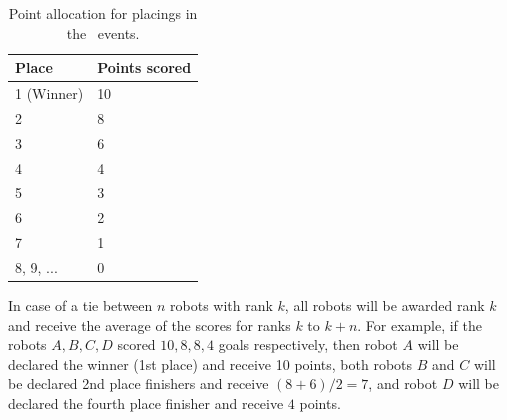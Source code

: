 \documentclass[12pt]{hurocup}
\begin{document}
\begin{lawlist}[OR]
\begin{itemize}
    \begin{table}
      \begin{center}
        \begin{tabular}{l|l}
          \hline
          Place & Points scored \\
          \hline
          1 (Winner) & 10 \\
          2          & 8 \\
          3          & 6 \\
          4          & 4 \\
          5          & 3 \\
          6          & 2 \\
          7          & 1 \\
          8, 9, ...  & 0 \\
          \hline
        \end{tabular}
      \end{center}
      \caption{Point allocation for placings in the \HuroCup\ events.}
      \label{point-allocation}
    \end{table}
  \end{itemize}

\item In case of a tie between $n$ robots with rank $k$, all robots
 will be awarded rank $k$ and receive the average of the scores for
 ranks $k$ to $k+n$.  For example, if the robots $A,B,C,D$ scored $10,
 8, 8, 4$ goals respectively, then robot $A$ will be declared the
 winner (1st place) and receive 10 points, both robots $B$ and $C$
 will be declared 2nd place finishers and receive $(8+6)/2=7$, and
 robot $D$ will be declared the fourth place finisher and receive $4$
 points.

\end{lawlist}
\end{document}
